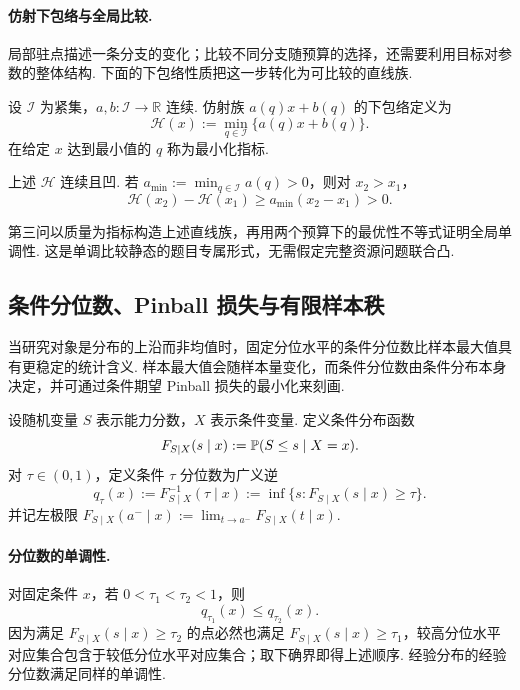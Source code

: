 \paragraph{仿射下包络与全局比较. \quad}
局部驻点描述一条分支的变化；比较不同分支随预算的选择，还需要利用目标对参数的整体结构. 下面的下包络性质把这一步转化为可比较的直线族. 
\begin{definition}[仿射族的下包络]\label{def:bg-affine-envelope-v37}
设 $\mathcal I$ 为紧集，$a,b:\mathcal I\to\mathbb R$ 连续. 仿射族 $a(q)x+b(q)$ 的下包络定义为
\[
\mathscr H(x):=\min_{q\in\mathcal I}\{a(q)x+b(q)\}.
\]
在给定 $x$ 达到最小值的 $q$ 称为最小化指标. 
\end{definition}
\begin{proposition}[下包络的凹性与单调性]\label{prop:bg-affine-envelope-v37}
上述 $\mathscr H$ 连续且凹. 若 $a_{\min}:=\min_{q\in\mathcal I}a(q)>0$，则对 $x_2>x_1$，
\[
\mathscr H(x_2)-\mathscr H(x_1)\ge a_{\min}(x_2-x_1)>0.
\]
\end{proposition}

第三问以质量为指标构造上述直线族，再用两个预算下的最优性不等式证明全局单调性. 这是单调比较静态的题目专属形式\cite{milgrom_shannon}，无需假定完整资源问题联合凸. 

\subsection{条件分位数、Pinball 损失与有限样本秩}\label{sec:bg-quantile}

当研究对象是分布的上沿而非均值时，固定分位水平的条件分位数比样本最大值具有更稳定的统计含义. 样本最大值会随样本量变化，而条件分位数由条件分布本身决定，并可通过条件期望 Pinball 损失的最小化来刻画. 

\begin{definition}[条件分布函数与条件分位数]\label{def:background-quantile}
设随机变量 $S$ 表示能力分数，$X$ 表示条件变量. 定义条件分布函数
\[
F_{S\mid X}(s\mid x):=\mathbb P(S\le s\mid X=x).
\]
对 $\tau\in(0,1)$，定义条件 $\tau$ 分位数为广义逆
\begin{equation}\label{eq:background-quantile}
q_\tau(x):=F^{-1}_{S\mid X}(\tau\mid x)
:=\inf\{s:F_{S\mid X}(s\mid x)\ge\tau\}.
\end{equation}
并记左极限
$F_{S\mid X}(a^-\mid x):=\lim_{t\to a^-}F_{S\mid X}(t\mid x)$. 
\end{definition}


\paragraph{分位数的单调性. \quad}
对固定条件 $x$，若 $0<\tau_1<\tau_2<1$，则
\[
q_{\tau_1}(x)\le q_{\tau_2}(x).
\]
因为满足 $F_{S\mid X}(s\mid x)\ge\tau_2$ 的点必然也满足
$F_{S\mid X}(s\mid x)\ge\tau_1$，较高分位水平对应集合包含于较低分位水平对应集合；取下确界即得上述顺序. 经验分布的经验分位数满足同样的单调性. 


